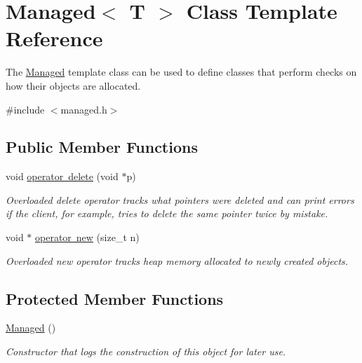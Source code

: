\hypertarget{classManaged}{}\section{Managed$<$ T $>$ Class Template Reference}
\label{classManaged}


The \mbox{\hyperlink{classManaged}{Managed}} template class can be used to define classes that perform checks on how their objects are allocated.  




{\ttfamily \#include $<$managed.\+h$>$}

\subsection*{Public Member Functions}
\begin{DoxyCompactItemize}
\item 
void \mbox{\hyperlink{classManaged_a86107594327f3a001230df9802cd4422}{operator delete}} (void $\ast$p)
\begin{DoxyCompactList}\small\item\em Overloaded delete operator tracks what pointers were deleted and can print errors if the client, for example, tries to delete the same pointer twice by mistake. \end{DoxyCompactList}\item 
void $\ast$ \mbox{\hyperlink{classManaged_a94f5168cf29183b0ae2ea3a3731c317a}{operator new}} (size\+\_\+t n)
\begin{DoxyCompactList}\small\item\em Overloaded new operator tracks heap memory allocated to newly created objects. \end{DoxyCompactList}\end{DoxyCompactItemize}
\subsection*{Protected Member Functions}
\begin{DoxyCompactItemize}
\item 
\mbox{\hyperlink{classManaged_a0be75425cb8e4ae478e48c46fccc4b69}{Managed}} ()
\begin{DoxyCompactList}\small\item\em Constructor that logs the construction of this object for later use. \end{DoxyCompactList}\end{DoxyCompactItemize}
